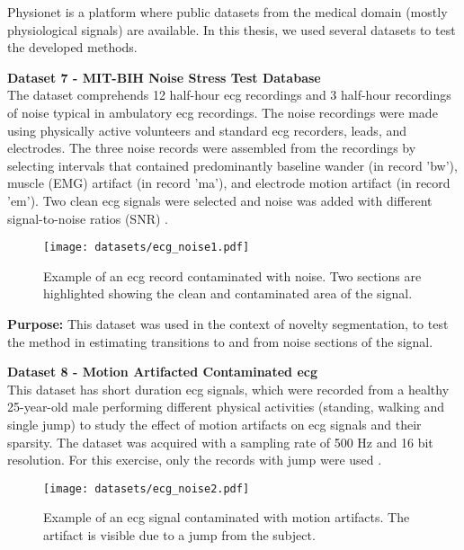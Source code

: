 Physionet is a platform where public datasets from the medical domain (mostly physiological signals) are available. In this thesis, we used several datasets to test the developed methods.

\textbf{Dataset 7 - MIT-BIH Noise Stress Test Database}\\

The dataset comprehends 12 half-hour \gls{ecg} recordings and 3 half-hour recordings of noise typical in ambulatory \gls{ecg} recordings. The noise recordings were made using physically active volunteers and standard \gls{ecg} recorders, leads, and electrodes. The three noise records were assembled from the recordings by selecting intervals that contained predominantly baseline wander (in record 'bw'), muscle (EMG) artifact (in record 'ma'), and electrode motion artifact (in record 'em'). Two clean \gls{ecg} signals were selected and noise was added with different signal-to-noise ratios (SNR) \cite{dataset6, PhysioNet}.\\

\begin{figure}
\centering
\texttt{[image: datasets/ecg\_noise1.pdf]}
\caption{Example of an \gls{ecg} record contaminated with noise. Two sections are highlighted showing the clean and contaminated area of the signal. \cite{dataset7}}
\label{fig:ecg1_dataset}
\end{figure}

\textbf{Purpose:} This dataset was used in the context of novelty segmentation, to test the method in estimating transitions to and from noise sections of the signal.
    
\textbf{Dataset 8 - Motion Artifacted Contaminated \gls{ecg}}\\

This dataset has short duration \gls{ecg} signals, which were recorded from a healthy 25-year-old male performing different physical activities (standing, walking and single jump) to study the effect of motion artifacts on \gls{ecg} signals and their sparsity. The dataset was acquired with a sampling rate of 500 Hz and 16 bit resolution. For this exercise, only the records with jump were used \cite{dataset7, PhysioNet}.\\

\begin{figure}
\centering
\texttt{[image: datasets/ecg\_noise2.pdf]}
\caption{Example of an \gls{ecg} signal contaminated with motion artifacts. The artifact is visible due to a jump from the subject.}
\label{fig:ecg2_dataset}
\end{figure}

